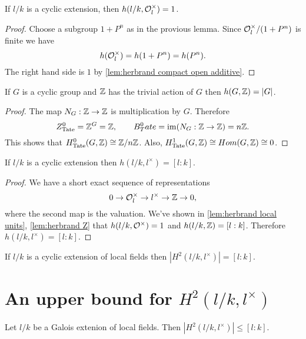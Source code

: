 \begin{lemma}\label{lem:herbrand local units}
	If $l/k$ is a cyclic extension, then $h(l/k, {\mathcal O}_l^\times) = 1$.
\end{lemma}

\begin{proof}
	Choose a subgroup $1+P^n$ as in the provious lemma.
	Since ${\mathcal O}_l^\times / (1+P^n)$ is finite we have
	\[
		h({\mathcal O}_l^\times) = h(1+P^n) = h(P^n).
	\]
	The right hand side is $1$ by \ref{lem:herbrand compact open additive}.
\end{proof}

\begin{lemma} \label{lem:herbrand Z}
	If $G$ is a cyclic group and ${\mathbb Z}$ has the trivial action of $G$ then $h(G,{\mathbb Z}) = |G|$.
\end{lemma}

\begin{proof}
	The map	$N_G : {\mathbb Z} \to {\mathbb Z}$ is multiplication by $G$.
	Therefore
	\[
		Z^0_{\mathrm{Tate}} = {\mathbb Z}^G = {\mathbb Z}, \qquad
		B^0_Tate = \mathrm{im}(N_G : {\mathbb Z} \to {\mathbb Z}) = n{\mathbb Z}.
	\]
	This shows that $H^0_{\mathrm{Tate}}(G,{\mathbb Z})\cong {\mathbb Z} / n{\mathbb Z}$.
	Also,	$H^1_{\mathrm{Tate}}(G,{\mathbb Z}) \cong Hom(G,{\mathbb Z}) \cong 0$.
\end{proof}

\begin{lemma} \label{lem:herbrand local l*}
	If $l/k$ is a cyclic extension then $h(l/k, l^\times)= [l:k]$.
\end{lemma}

\begin{proof}
	We have a short exact sequence of representations
	\[
		0 \to {\mathcal O}_l^\times \to l^\times \to {\mathbb Z} \to 0,
 	\]
	where the second map is the valuation.
	We've shown in \ref{lem:herbrand local units}, \ref{lem:herbrand Z}
	that $h(l/k,{\mathcal O}^\times)=1$ and $h(l/k,{\mathbb Z}) = [l:k]$.
	Therefore $h(l/k,l^\times) = [l:k]$.
\end{proof}


\begin{lemma} \label{lem:local H2 l*}
	If $l/k$ is a cyclic extension of local fields then $|H^2(l/k,l^\times)| = [l:k]$.
\end{lemma}




\section{An upper bound for \texorpdfstring{$H^2(l/k,l^\times)$}{$H^2(l/k,l*)$}}

\begin{theorem} \label{lem:local H2 upper bound}
	Let $l/k$ be a Galois extenion of local fields.
	Then $|H^2(l/k,l^\times)| \le [l:k]$.
\end{theorem}

